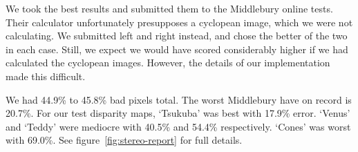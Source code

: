 We took the best results and submitted them to the Middlebury online tests.
\cite{stereocorrespondence, middlebury} Their calculator unfortunately
presupposes a cyclopean image, which we were not calculating. We submitted left
and right instead, and chose the better of the two in each case. Still, we
expect we would have scored considerably higher if we had calculated the
cyclopean images. However, the details of our implementation made this
difficult.

We had 44.9\% to 45.8\% bad pixels total. The worst Middlebury have on record is
20.7\%. \cite{stereocorrespondence, middlebury} For our test disparity maps,
`Tsukuba' was best with 17.9\% error. `Venus' and `Teddy' were mediocre with
40.5\% and 54.4\% respectively. `Cones' was worst with 69.0\%. See
figure~\ref{fig:stereo-report} for full details.

